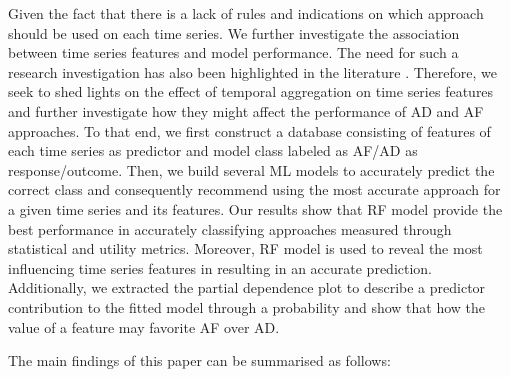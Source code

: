 \documentclass[preprint, 3p,
authoryear]{elsarticle} %
\begin{document}
Given the fact that there is a lack of rules and indications on which
approach should be used on each time series. We further investigate the
association between time series features and model performance. The need
for such a research investigation has also been highlighted in the
literature \citep{babai2021demand}. Therefore, we seek to shed lights on
the effect of temporal aggregation on time series features and further
investigate how they might affect the performance of AD and AF
approaches. To that end, we first construct a database consisting of
features of each time series as predictor and model class labeled as
AF/AD as response/outcome. Then, we build several ML models to
accurately predict the correct class and consequently recommend using
the most accurate approach for a given time series and its features. Our
results show that RF model provide the best performance in accurately
classifying approaches measured through statistical and utility metrics.
Moreover, RF model is used to reveal the most influencing time series
features in resulting in an accurate prediction. Additionally, we
extracted the partial dependence plot to describe a predictor
contribution to the fitted model through a probability and show that how
the value of a feature may favorite AF over AD.

The main findings of this paper can be summarised as follows:
\end{document}
